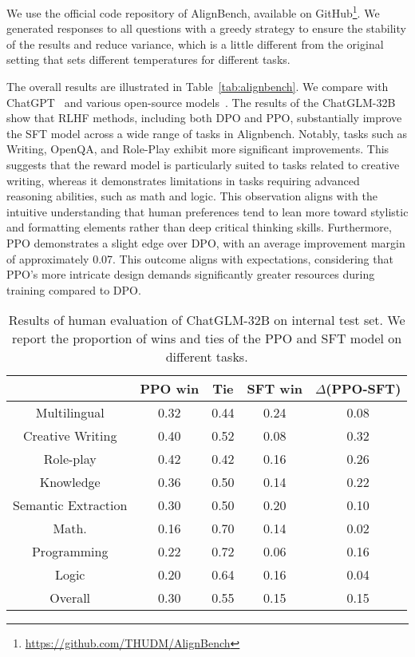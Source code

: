 We use the official code repository of AlignBench, available on GitHub\footnote{\url{https://github.com/THUDM/AlignBench}}. We generated responses to all questions with a greedy strategy to ensure the stability of the results and reduce variance, which is a little different from the original setting that sets different temperatures for different tasks.

 The overall results are illustrated in Table~\ref{tab:alignbench}. We compare with ChatGPT~\cite{achiam2023gpt} and various open-source models~\cite{bi2024deepseek,bai2023qwen,touvron2023llama}. The results of the ChatGLM-32B show that RLHF methods, including both DPO and PPO, substantially improve the SFT model across a wide range of tasks in Alignbench. Notably, tasks such as Writing, OpenQA, and Role-Play exhibit more significant improvements. This suggests that the reward model is particularly suited to tasks related to creative writing, whereas it demonstrates limitations in tasks requiring advanced reasoning abilities, such as math and logic. This observation aligns with the intuitive understanding that human preferences tend to lean more toward stylistic and formatting elements rather than deep critical thinking skills.
Furthermore, PPO demonstrates a slight edge over DPO, with an average improvement margin of approximately 0.07. This outcome aligns with expectations, considering that PPO's more intricate design demands significantly greater resources during training compared to DPO.

\begin{table}[]
    \centering
    \caption{Results of human evaluation of ChatGLM-32B on internal test set. \textmd{We report the proportion of wins and ties of the PPO and SFT model on different tasks.}}
    \begin{tabular}{c|ccc|c}
    \toprule[1.2pt]
         &  PPO win & Tie & SFT win & $\Delta$(PPO-SFT) \\
    \midrule
        Multilingual & 0.32 & 0.44 & 0.24 & 0.08\\
        Creative Writing & 0.40 & 0.52 & 0.08 & 0.32 \\
        Role-play & 0.42 & 0.42 & 0.16 &  0.26 \\
        Knowledge & 0.36 & 0.50 & 0.14 &  0.22 \\
        Semantic Extraction & 0.30 & 0.50 & 0.20 & 0.10  \\
        Math. & 0.16 & 0.70 & 0.14 & 0.02 \\
        Programming & 0.22 & 0.72 & 0.06 & 0.16  \\
        Logic & 0.20 & 0.64 & 0.16 & 0.04 \\
    \midrule
        Overall & 0.30 & 0.55 & 0.15 & 0.15 \\
    \bottomrule[1.2pt]
    \end{tabular}
    \vspace{-2mm}
    \label{tab:human_eval}
\end{table}

